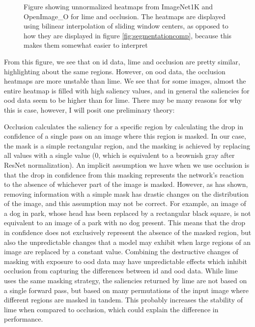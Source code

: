 \documentclass[UKenglish]{uiomasterthesis} %
\theoremstyle{definition}
\begin{document}
\begin{figure}[H]
\begin{center}
        \caption[LIME and Occlusion heatmap comparison]{Figure showing unnormalized heatmaps from ImageNet1K and OpenImage\_O for \ac{lime} and occlusion. The heatmaps are displayed using bilinear interpolation of sliding window centers, as opposed to how they are displayed in figure \ref{fig:segmentationcomp}, because this makes them somewhat easier to interpret}
    \label{fig:lime_occ_comp}
    \end{center}
\end{figure}

From this figure, we see that on \ac{id} data, \ac{lime} and occlusion are pretty similar, highlighting about the same regions. However, on \ac{ood} data, the occlusion heatmaps are more unstable than \ac{lime}. We see that for some images, almost the entire heatmap is filled with high saliency values, and in general the saliencies for \ac{ood} data seem to be higher than for \ac{lime}. There may be many reasons for why this is case, however, I will posit one preliminary theory: 

Occlusion calculates the saliency for a specific region by calculating the drop in confidence of a single pass on an image where this region is masked. In our case, the mask is a simple rectangular region, and the masking is achieved by replacing all values with a single value (0, which is equivalent to a brownish gray after ResNet normalization). An implicit assumption we have when we use occlusion is that the drop in confidence from this masking represents the network's reaction to the absence of whichever part of the image is masked. However, as \cite{roar} has shown, removing information with a simple mask has drastic changes on the distribution of the image, and this assumption may not be correct. For example, an image of a dog in park, whose head has been replaced by a rectangular black square, is not equivalent to an image of a park with no dog present. This means that the drop in confidence does not exclusively represent the absence of the masked region, but also the unpredictable changes that a model may exhibit when large regions of an image are replaced by a constant value. Combining the destructive changes of masking with exposure to \ac{ood} data may have unpredictable effects which inhibit occlusion from capturing the differences between \ac{id} and \ac{ood} data. While \ac{lime} uses the same masking strategy, the saliencies returned by \ac{lime} are not based on a single forward pass, but based on many permutations of the input image where different regions are masked in tandem. This probably increases the stability of \ac{lime} when compared to occlusion, which could explain the difference in performance.
\end{document}

